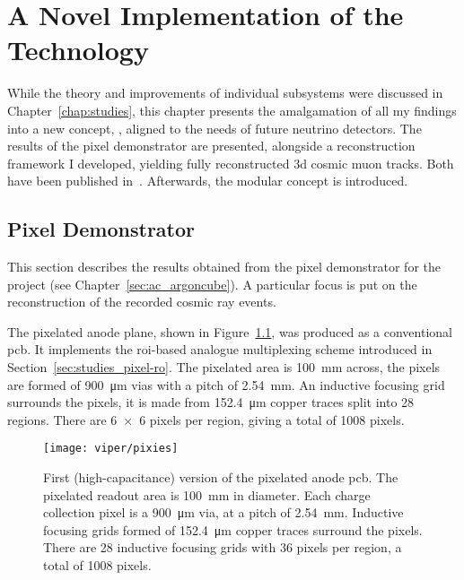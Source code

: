 \chapter{A Novel Implementation of the  Technology}
\label{chap:ac}

While the theory and improvements of individual \lartpc{} subsystems were discussed in Chapter~\ref{chap:studies}, this chapter presents the amalgamation of all my findings into a new \lartpc{} concept, \AC{}, aligned to the needs of future \lartpc{} neutrino detectors.
The results of the \AC{} pixel demonstrator are presented, alongside a reconstruction framework I developed, yielding fully reconstructed \gls{3d} cosmic muon tracks.
Both have been published in~\cite{pixel_paper, pixel_proceedings}.
Afterwards, the \AC{} modular \lartpc{} concept is introduced.


\section{\AC{} Pixel Demonstrator}
\label{sec:ac_viper}

This section describes the results obtained from the pixel demonstrator for the \AC{} project (see Chapter~\ref{sec:ac_argoncube}).
A particular focus is put on the reconstruction of the recorded cosmic ray events.
 
The pixelated anode plane, shown in Figure~\ref{fig:viper_pixies}, was produced as a conventional \gls{pcb}.
It implements the \gls{roi}-based analogue multiplexing scheme introduced in Section~\ref{sec:studies_pixel-ro}.
The pixelated area is \SI{100}{\milli\metre} across, the pixels are formed of \SI{900}{\micro\metre} vias with a pitch of \SI{2.54}{\milli\metre}.
An inductive focusing grid surrounds the pixels, it is made from \SI{152.4}{\micro\metre} copper traces split into 28 regions.
There are \num{6 x 6} pixels per region, giving a total of 1008 pixels. 

\begin{figure}[tbp]
	\centering
	\texttt{[image: viper/pixies]}
	\caption[Pixel demonstrator readout plane]{%
		First (high-capacitance) version of the pixelated anode \acrshort{pcb}.
		The pixelated readout area is \SI{100}{\milli\metre} in diameter.
		Each charge collection pixel is a \SI{900}{\micro\metre} via, at a pitch of \SI{2.54}{\milli\metre}.
		Inductive focusing grids formed of \SI{152.4}{\micro\metre} copper traces surround the pixels.
		There are \num{28} inductive focusing grids with \num{36} pixels per region, a total of \num{1008} pixels.
	}
	\label{fig:viper_pixies}
\end{figure}

